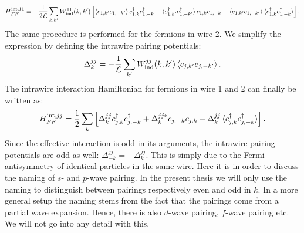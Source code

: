 \begin{equation}
H^\text{int,11}_{FF} = -\frac{1}{2\mathcal{L}}\sum_{k,k'} W^{11}_{\text{ind}}(k, k')\left[ \braket{ c_{1, k'}c_{1, -k'}} c^\dagger_{1,k} c^\dagger_{1, -k} + \braket {c^\dagger_{1, k'}c^\dagger_{1, -k'}} c_{1, k} c_{1, -k} - \braket {c_{1, k'}c_{1, -k'}} \braket {c^\dagger_{1, k}c^\dagger_{1, -k}} \right]. \nonumber
\end{equation}
The same procedure is performed for the fermions in wire 2. We simplify the expression by defining the intrawire pairing potentials:
\begin{equation}
\Delta^{jj}_k = -\frac{1}{\mathcal{L}}\sum_{k'}W^{jj}_{\text{ind}}(k,k')\braket {c_{j, k'}c_{j, -k'}}.
\label{eq.intrawirepairingpotentialdef}
\end{equation}
The intrawire interaction Hamiltonian for fermions in wire 1 and 2 can finally be written as:
\begin{equation}
H^{\text{int},jj}_{FF} = \frac{1}{2}\sum_k \left[\Delta^{jj}_k c^\dagger_{j,k}c^\dagger_{j,-k} + \Delta^{jj *}_k c_{j,-k}c_{j,k} - \Delta^{jj}_k\braket{c^\dagger_{j,k}c^\dagger_{j,-k}} \right].
\label{eq.Hintintrawire.meanfield}
\end{equation}
Since the effective interaction is odd in its arguments, the intrawire pairing potentials are odd as well: $\Delta^{jj}_{-k} = -\Delta^{jj}_k$. This is simply due to the Fermi antisymmetry of identical particles in the same wire. Here it is in order to discuss the naming of $s$- and $p$-wave pairing. In the present thesis we will only use the naming to distinguish between pairings respectively even and odd in $k$. In a more general setup the naming stems from the fact that the pairings come from a partial wave expansion. Hence, there is also $d$-wave pairing, $f$-wave pairing etc. We will not go into any detail with this.

